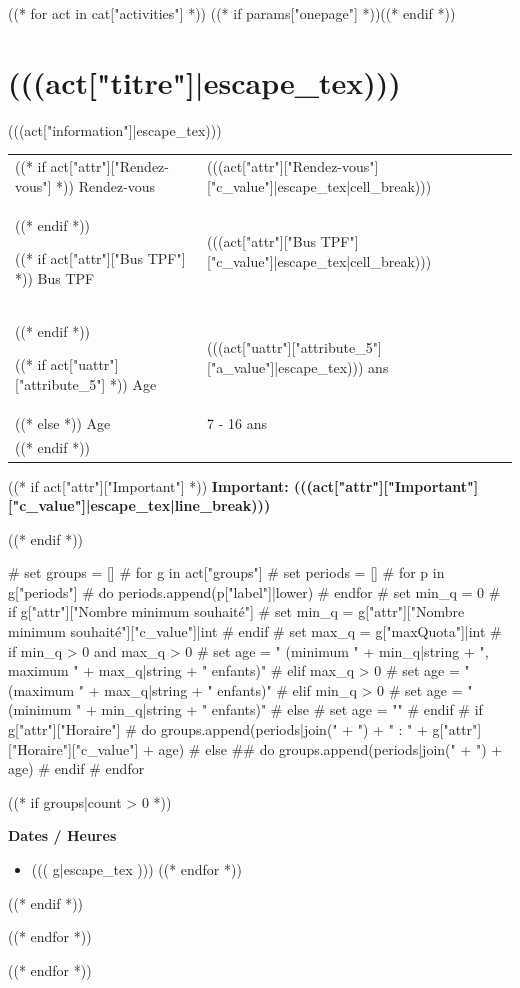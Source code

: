 \documentclass [parskip=full, paper=a4paper]{scrbook}
\begin{document}
((* for act in cat["activities"] *))
((* if params["onepage"] *))\newpage((* endif *))
\begin{minipage}[t]{\textwidth}%
\section{(((act["titre"]|escape_tex)))}

(((act["information"]|escape_tex)))
\medskip

\begin{tabulary}{0.9\textwidth}{p{2.5cm}|L}

((* if act["attr"]["Rendez-vous"] *))
Rendez-vous & (((act["attr"]["Rendez-vous"]["c_value"]|escape_tex|cell_break))) \\
((* endif *))

((* if act["attr"]["Bus TPF"] *))
Bus TPF & (((act["attr"]["Bus TPF"]["c_value"]|escape_tex|cell_break))) \\
((* endif *))

((* if act["uattr"]["attribute_5"] *))
Age & (((act["uattr"]["attribute_5"]["a_value"]|escape_tex))) ans \\
((* else *))
Age & 7 - 16 ans \\
((* endif *))

\end{tabulary}

((* if act["attr"]["Important"] *))
\medskip
\textbf{Important: (((act["attr"]["Important"]["c_value"]|escape_tex|line_break)))}

((* endif *))

# set groups = []
# for g in act["groups"]
#   set periods = []
#   for p in g["periods"]
#     do periods.append(p["label"]|lower)
#   endfor
#   set min_q = 0
#   if g["attr"]["Nombre minimum souhaité"]
#     set min_q = g["attr"]["Nombre minimum souhaité"]["c_value"]|int
#   endif
#   set max_q = g["maxQuota"]|int
#   if min_q > 0 and max_q > 0
#     set age = " (minimum " + min_q|string + ", maximum " + max_q|string + " enfants)"
#   elif max_q > 0
#     set age = " (maximum " + max_q|string + " enfants)"
#   elif min_q > 0
#     set age = " (minimum " + min_q|string + " enfants)"
#   else
#     set age = ""
#   endif
#   if g["attr"]["Horaire"]
#     do groups.append(periods|join(" + ") + " : " + g["attr"]["Horaire"]["c_value"] + age)
#   else
##    do groups.append(periods|join(" + ") + age)
#   endif
# endfor

((* if groups|count > 0 *))
\medskip

\textbf{Dates / Heures}
\medskip

\begin{itemize}[noitemsep]
((* for g in groups *))
\item ((( g|escape_tex )))
((* endfor *))
\end{itemize}
((* endif *))
\end{minipage}
((* endfor *))


((* endfor *))

\end{document}
